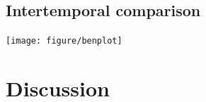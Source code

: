 \documentclass[twoside]{article}\usepackage[]{graphicx}\usepackage[]{color}
\newenvironment{knitrout}{}{} %
\begin{document}
\begin{multicols}{2}
\begin{knitrout}
\end{knitrout}


\subsection{Intertemporal comparison}



\begin{knitrout}
\color{fgcolor}
\texttt{[image: figure/benplot]} 

\end{knitrout}




\section{Discussion}






\end{multicols}
\end{document}
